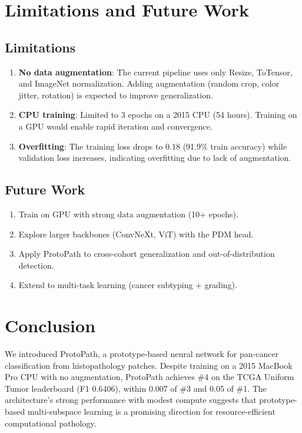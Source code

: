 \documentclass[11pt,twocolumn]{article}
\begin{document}
\section{Limitations and Future Work}

\subsection{Limitations}

\begin{enumerate}[nosep]
    \item \textbf{No data augmentation}: The current pipeline uses only Resize, ToTensor, and ImageNet normalization. Adding augmentation (random crop, color jitter, rotation) is expected to improve generalization.
    \item \textbf{CPU training}: Limited to 3 epochs on a 2015 CPU (54 hours). Training on a GPU would enable rapid iteration and convergence.
    \item \textbf{Overfitting}: The training loss drops to 0.18 (91.9\% train accuracy) while validation loss increases, indicating overfitting due to lack of augmentation.
\end{enumerate}

\subsection{Future Work}

\begin{enumerate}[nosep]
    \item Train on GPU with strong data augmentation (10+ epochs).
    \item Explore larger backbones (ConvNeXt, ViT) with the PDM head.
    \item Apply ProtoPath to cross-cohort generalization and out-of-distribution detection.
    \item Extend to multi-task learning (cancer subtyping + grading).
\end{enumerate}

\section{Conclusion}

We introduced ProtoPath, a prototype-based neural network for pan-cancer classification from histopathology patches. Despite training on a 2015 MacBook Pro CPU with no augmentation, ProtoPath achieves \#4 on the TCGA Uniform Tumor leaderboard (F1 0.6406), within 0.007 of \#3 and 0.05 of \#1. The architecture's strong performance with modest compute suggests that prototype-based multi-subspace learning is a promising direction for resource-efficient computational pathology.
\end{document}
